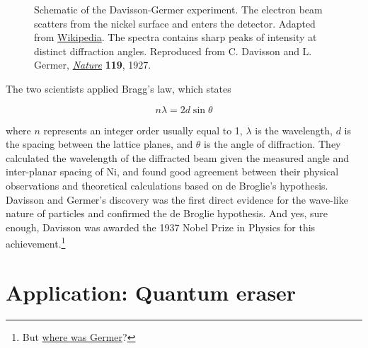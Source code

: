 \begin{figure}[!h]
	\centering
	\caption{\protect{} Schematic of the Davisson-Germer experiment. 
	The electron beam scatters from the nickel surface and enters the detector. 
	Adapted from \href{https://en.wikipedia.org/wiki/Davisson\%E2\%80\%93Germer\_experiment}{Wikipedia}. 
	\protect{} The spectra contains sharp peaks of intensity at distinct diffraction angles. 
	Reproduced from C. Davisson and L. Germer, \href{https://www.nature.com/nature/journal/v119/n2998/pdf/119558a0.pdf}{\emph{Nature}} \textbf{119}, 1927.}
	\label{fig:DG}
\end{figure}

The two scientists applied Bragg's law, which states 

\begin{tcolorbox}[title=Bragg's law] \vspace{-2ex}
	\begin{equation}
		n\lambda = 2d\sin\theta \label{eq:bragg}
	\end{equation}
\end{tcolorbox}

\noindent where $n$ represents an integer order usually equal to 1, $\lambda$ is the wavelength, $d$ is the spacing between the lattice planes, and $\theta$ is the angle of diffraction. 
They calculated the wavelength of the diffracted beam given the measured angle and inter-planar spacing of Ni, and found good agreement between their physical observations and theoretical calculations based on de Broglie's hypothesis. 
Davisson and Germer's discovery was the first direct evidence for the wave-like nature of particles and confirmed the de Broglie hypothesis. 
And yes, sure enough, Davisson was awarded the 1937 Nobel Prize in Physics for this achievement.\footnote{But \href{http://www.nobelprize.org/nobel\_prizes/physics/laureates/1937/press.html}{where was Germer}?}


\section{Application: Quantum eraser}

